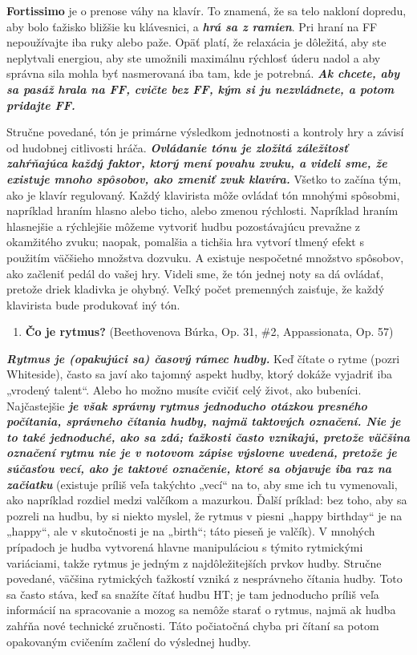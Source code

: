 \documentclass[11pt,a4paper%
]{book}
\begin{document}
\textbf{Fortissimo} je o prenose váhy na klavír. To znamená, že sa telo nakloní dopredu, aby bolo ťažisko bližšie ku klávesnici, a \emph{\textbf{hrá sa z ramien}}. Pri hraní na FF nepoužívajte iba ruky alebo paže. Opäť platí, že relaxácia je dôležitá, aby ste neplytvali energiou, aby ste umožnili maximálnu rýchlosť úderu nadol a aby správna sila mohla byť nasmerovaná iba tam, kde je potrebná. \emph{\textbf{Ak chcete, aby sa pasáž hrala na FF, cvičte bez FF, kým si ju nezvládnete, a potom pridajte FF.}}

Stručne povedané, tón je primárne výsledkom jednotnosti a kontroly hry a závisí od hudobnej citlivosti hráča. \emph{\textbf{Ovládanie tónu je zložitá záležitosť zahŕňajúca}} \emph{\textbf{každý faktor, ktorý mení povahu zvuku, a videli sme, že existuje mnoho spôsobov, ako zmeniť zvuk klavíra.}} Všetko to začína tým, ako je klavír regulovaný. Každý klavirista môže ovládať tón mnohými spôsobmi, napríklad hraním hlasno alebo ticho, alebo zmenou rýchlosti. Napríklad hraním hlasnejšie a rýchlejšie môžeme vytvoriť hudbu pozostávajúcu prevažne z okamžitého zvuku; naopak, pomalšia a tichšia hra vytvorí tlmený efekt s použitím väčšieho množstva dozvuku. A existuje nespočetné množstvo spôsobov, ako začleniť pedál do vašej hry. Videli sme, že tón jednej noty sa dá ovládať, pretože driek kladivka je ohybný. Veľký počet premenných zaisťuje, že každý klavirista bude produkovať iný tón.

\begin{enumerate}
\def\labelenumi{\alph{enumi}.}
\setcounter{enumi}{1}
\item
  \textbf{Čo je rytmus?} (Beethovenova Búrka, Op. 31, \#2, Appassionata, Op. 57) 
\end{enumerate}
\emph{\textbf{Rytmus je (opakujúci sa) časový rámec hudby.}} Keď čítate o rytme (pozri Whiteside), často sa javí ako tajomný aspekt hudby, ktorý dokáže vyjadriť iba „vrodený talent``. Alebo ho možno musíte cvičiť celý život, ako bubeníci. Najčastejšie \emph{\textbf{je však správny rytmus jednoducho otázkou presného počítania, správneho čítania hudby, najmä taktových označení. Nie je to také jednoduché, ako sa zdá; ťažkosti často vznikajú, pretože väčšina označení rytmu nie je v notovom zápise výslovne uvedená, pretože je súčasťou vecí, ako je taktové označenie, ktoré sa objavuje iba raz na začiatku}} (existuje príliš veľa takýchto „vecí`` na to, aby sme ich tu vymenovali, ako napríklad rozdiel medzi valčíkom a mazurkou. Ďalší príklad: bez toho, aby sa pozreli na hudbu, by si niekto myslel, že rytmus v piesni „happy birthday`` je na „happy``, ale v skutočnosti je na „birth``; táto pieseň je valčík). V mnohých prípadoch je hudba vytvorená hlavne manipuláciou s týmito rytmickými variáciami, takže rytmus je jedným z najdôležitejších prvkov hudby. Stručne povedané, väčšina rytmických ťažkostí vzniká z nesprávneho čítania hudby. Toto sa často stáva, keď sa snažíte čítať hudbu HT; je tam jednoducho príliš veľa informácií na spracovanie a mozog sa nemôže starať o rytmus, najmä ak hudba zahŕňa nové technické zručnosti. Táto počiatočná chyba pri čítaní sa potom opakovaným cvičením začlení do výslednej hudby.
\end{document}
